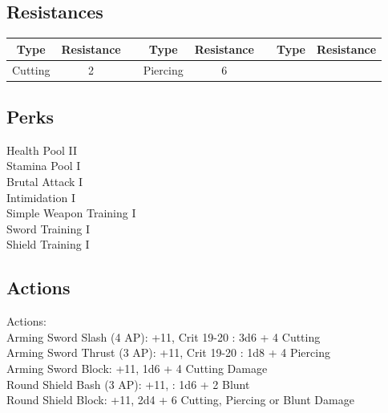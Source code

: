 \subsection{Resistances}
\begin{minipage}[H]{1\textwidth}
    \centering
    \begin{tabular}[c]{|c | c | c | c | c | c | c | c|}
        \hline
        Type & Resistance && Type & Resistance && Type & Resistance\\
        \hline
        Cutting & 2 &&
        Piercing & 6\\
        \hline
    \end{tabular}
\end{minipage}

\subsection{Perks}
Health Pool II\\
Stamina Pool I\\
Brutal Attack I\\
Intimidation I\\
Simple Weapon Training I\\
Sword Training I\\
Shield Training I\\

\subsection{Actions}
Actions:\\
Arming Sword Slash (4 AP): +11, Crit 19-20 : 3d6 + 4 Cutting\\

Arming Sword Thrust (3 AP): +11, Crit 19-20 : 1d8 + 4 Piercing\\

Arming Sword Block: +11, 1d6 + 4 Cutting Damage\\

Round Shield Bash (3 AP): +11, : 1d6 + 2 Blunt\\

Round Shield Block: +11, 2d4 + 6 Cutting, Piercing or Blunt Damage\\


